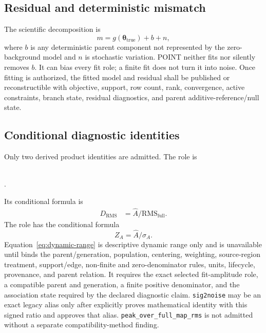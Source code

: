 \subsection{Residual and deterministic mismatch}\label{sec:residual}

The scientific decomposition is
\begin{equation}
m=g(\boldsymbol{\theta}_{\mathrm{true}})+b+n,
\label{eq:residual}
\end{equation}
where $b$ is any deterministic parent component not represented by the
zero-background model and $n$ is stochastic variation. POINT neither fits nor
silently removes $b$. It can bias every fit role; a finite fit does not turn
it into noise. Once fitting is authorized, the fitted model and residual
shall be published or reconstructible with objective, support, row count,
rank, convergence, active constraints, branch state, residual diagnostics,
and parent additive-reference/null state.

\subsection{Conditional diagnostic identities}\label{sec:diagnostics}

Only two derived product identities are admitted. The role is
\begin{center}
\\
.
\end{center}
Its conditional formula is
\begin{align}
D_{\mathrm{RMS}}&=\widehat A/\mathrm{RMS}_{\mathrm{full}}.
\label{eq:dynamic-range}
\end{align}
The role  has the conditional
formula
\begin{equation}
Z_A=\widehat A/\sigma_A.
\label{eq:formal-standardization}
\end{equation}
Equation~\ref{eq:dynamic-range} is descriptive dynamic range only and is
unavailable until \RMSMethod{} binds the parent/generation, population,
centering, weighting, source-region treatment, support/edge, non-finite and
zero-denominator rules, units, lifecycle, provenance, and parent relation. It
requires the exact selected fit-amplitude role, a compatible parent and
generation, a finite positive denominator, and the association state required
by the declared diagnostic claim. \texttt{sig2noise} may be an exact legacy
alias only after \RMSMethod{} explicitly proves mathematical identity with
this signed ratio and approves that alias.
\texttt{peak\_over\_full\_map\_rms} is not admitted without a separate
compatibility-method finding.

